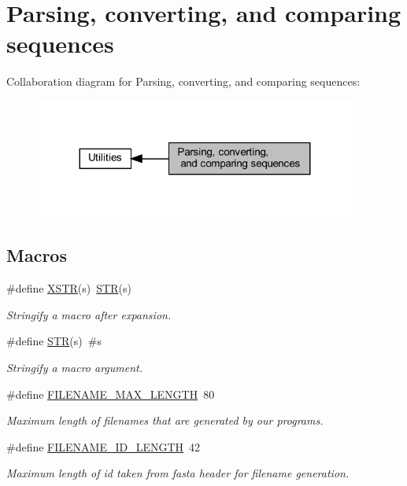 \hypertarget{group__string__utils}{}\section{Parsing, converting, and comparing sequences}
\label{group__string__utils}
Collaboration diagram for Parsing, converting, and comparing sequences\+:
\nopagebreak
\begin{figure}[H]
\begin{center}
\leavevmode
\includegraphics[width=299pt]{group__string__utils}
\end{center}
\end{figure}
\subsection*{Macros}
\begin{DoxyCompactItemize}
\item 
\mbox{\label{group__string__utils_ga03943706e48069237cd57f2d35ca987e}} 
\#define \hyperlink{group__string__utils_ga03943706e48069237cd57f2d35ca987e}{X\+S\+TR}(s)~\hyperlink{group__string__utils_ga6388870e639eee9c0a69446876f1f8cc}{S\+TR}(s)
\begin{DoxyCompactList}\small\item\em Stringify a macro after expansion. \end{DoxyCompactList}\item 
\mbox{\label{group__string__utils_ga6388870e639eee9c0a69446876f1f8cc}} 
\#define \hyperlink{group__string__utils_ga6388870e639eee9c0a69446876f1f8cc}{S\+TR}(s)~\#s
\begin{DoxyCompactList}\small\item\em Stringify a macro argument. \end{DoxyCompactList}\item 
\#define \hyperlink{group__string__utils_gafb228174279df9486a5cb56ac0bc79a3}{F\+I\+L\+E\+N\+A\+M\+E\+\_\+\+M\+A\+X\+\_\+\+L\+E\+N\+G\+TH}~80
\begin{DoxyCompactList}\small\item\em Maximum length of filenames that are generated by our programs. \end{DoxyCompactList}\item 
\#define \hyperlink{group__string__utils_ga33c3b1826b8e2739f09f111ec719ded5}{F\+I\+L\+E\+N\+A\+M\+E\+\_\+\+I\+D\+\_\+\+L\+E\+N\+G\+TH}~42
\begin{DoxyCompactList}\small\item\em Maximum length of id taken from fasta header for filename generation. \end{DoxyCompactList}\end{DoxyCompactItemize}

